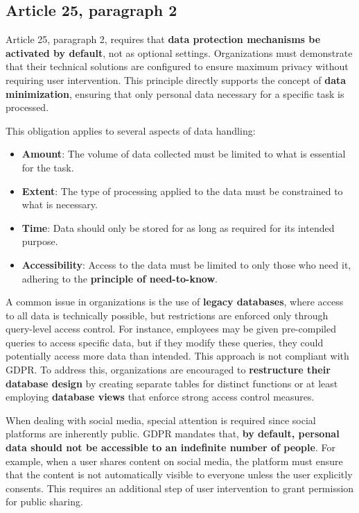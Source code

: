 \subsection{Article 25, paragraph 2}
Article 25, paragraph 2, requires that \textbf{data protection
mechanisms be activated by default}, not as optional settings.
Organizations must demonstrate that their technical solutions are
configured to ensure maximum privacy without requiring user
intervention. This principle directly supports the concept of
\textbf{data minimization}, ensuring that only personal data necessary
for a specific task is processed.  

This obligation applies to several aspects of data handling:  
\begin{itemize}
  \item \textbf{Amount}: The volume of data collected must be limited
    to what is essential for the task.  
  \item \textbf{Extent}: The type of processing applied to the data
    must be constrained to what is necessary.  
  \item \textbf{Time}: Data should only be stored for as long as
    required for its intended purpose.  
  \item \textbf{Accessibility}: Access to the data must be limited to
    only those who need it, adhering to the \textbf{principle of
    need-to-know}.  
\end{itemize}

A common issue in organizations is the use of \textbf{legacy
databases}, where access to all data is technically possible, but
restrictions are enforced only through query-level access control. For
instance, employees may be given pre-compiled queries to access
specific data, but if they modify these queries, they could
potentially access more data than intended. This approach is not
compliant with GDPR. To address this, organizations are encouraged to
\textbf{restructure their database design} by creating separate tables
for distinct functions or at least employing \textbf{database views}
that enforce strong access control measures.  

When dealing with social media, special attention is required since
social platforms are inherently public. GDPR mandates that, \textbf{by
default, personal data should not be accessible to an indefinite
number of people}. For example, when a user shares content on social
media, the platform must ensure that the content is not automatically
visible to everyone unless the user explicitly consents. This requires
an additional step of user intervention to grant permission for public
sharing.  

